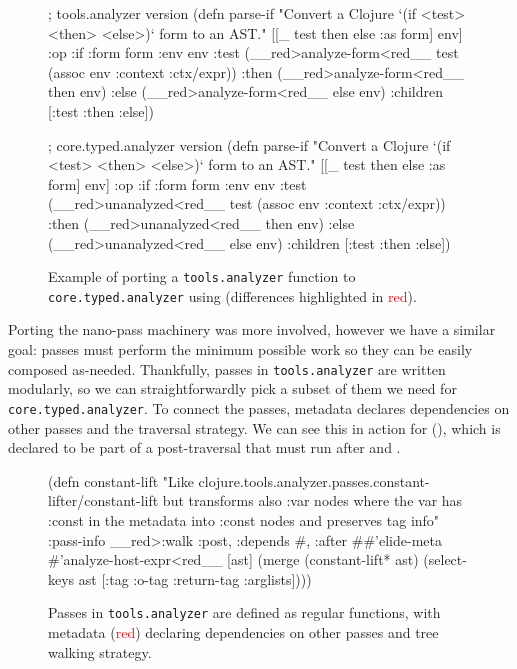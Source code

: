 \begin{figure*}
\begin{cljlisting}
; tools.analyzer version
(defn parse-if
  "Convert a Clojure `(if <test> <then> <else>)` form to an AST."
  [[_ test then else :as form] env]
  {:op      :if
   :form     form
   :env      env
   :test     (__red>analyze-form<red__ test (assoc env :context :ctx/expr))
   :then     (__red>analyze-form<red__ then env)
   :else     (__red>analyze-form<red__ else env)
   :children [:test :then :else]})

; core.typed.analyzer version
(defn parse-if
  "Convert a Clojure `(if <test> <then> <else>)` form to an AST."
  [[_ test then else :as form] env]
  {:op      :if
   :form     form
   :env      env
   :test     (__red>unanalyzed<red__ test (assoc env :context :ctx/expr))
   :then     (__red>unanalyzed<red__ then env)
   :else     (__red>unanalyzed<red__ else env)
   :children [:test :then :else]})
\end{cljlisting}

  \caption{Example of porting a \texttt{tools.analyzer} function
  to \texttt{core.typed.analyzer} using  (differences highlighted in \textcolor{red}{red}).
  }
  \label{fig:analyze:parse-if-port}
\end{figure*}

Porting the nano-pass machinery was more involved, however
we have a similar goal: passes must perform the minimum possible
work so they can be easily composed as-needed.
Thankfully, passes in \texttt{tools.analyzer} are written modularly,
so we can straightforwardly pick a subset of them we need for \texttt{core.typed.analyzer}.
To connect the passes, metadata declares dependencies on other passes
and the traversal strategy.
We can see this in action for  (),
which is declared to be part of a post-traversal
that must run after  and .

\begin{figure}
\begin{cljlisting}
(defn constant-lift
  "Like clojure.tools.analyzer.passes.constant-lifter/constant-lift but
   transforms also :var nodes where the var has :const in the metadata
   into :const nodes and preserves tag info"
  {:pass-info __red>{:walk :post, :depends #{},
               :after #{#'elide-meta #'analyze-host-expr}}<red__}
  [ast]
  (merge (constant-lift* ast)
         (select-keys ast [:tag :o-tag :return-tag :arglists])))
\end{cljlisting}
  \caption{Passes in \texttt{tools.analyzer} are defined as regular functions,
  with  metadata (\textcolor{red}{red}) declaring dependencies on other passes and tree walking strategy.}
  \label{fig:analyzer:constant-lift}
\end{figure}

